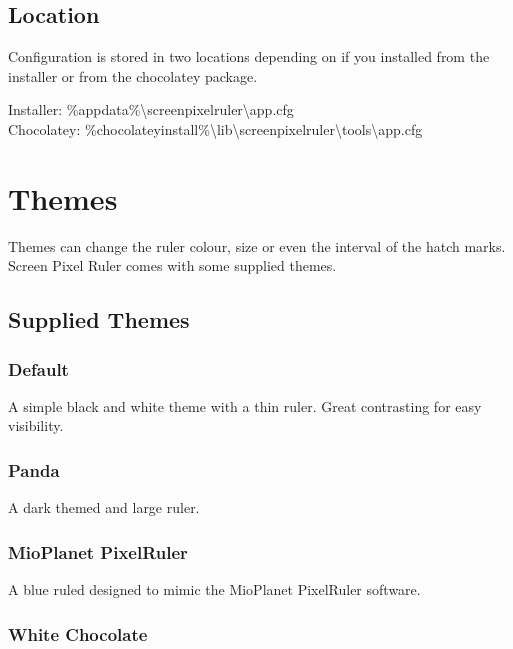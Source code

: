 \documentclass[
]{book}
\begin{document}
\hypertarget{location}{%
\section{Location}\label{location}}

Configuration is stored in two locations depending on if you installed from the installer or from the chocolatey package.

Installer: \%appdata\%\textbackslash screenpixelruler\textbackslash app.cfg\\
Chocolatey: \%chocolateyinstall\%\textbackslash lib\textbackslash screenpixelruler\textbackslash tools\textbackslash app.cfg

\hypertarget{themes}{%
\chapter{Themes}\label{themes}}

Themes can change the ruler colour, size or even the interval of the hatch marks.
Screen Pixel Ruler comes with some supplied themes.

\hypertarget{supplied-themes}{%
\section{Supplied Themes}\label{supplied-themes}}

\hypertarget{default}{%
\subsection{Default}\label{default}}

A simple black and white theme with a thin ruler. Great contrasting for easy visibility.

\hypertarget{panda}{%
\subsection{Panda}\label{panda}}

A dark themed and large ruler.

\hypertarget{mioplanet-pixelruler}{%
\subsection{MioPlanet PixelRuler}\label{mioplanet-pixelruler}}

A blue ruled designed to mimic the MioPlanet PixelRuler software.

\hypertarget{white-chocolate}{%
\subsection{White Chocolate}\label{white-chocolate}}
\end{document}
